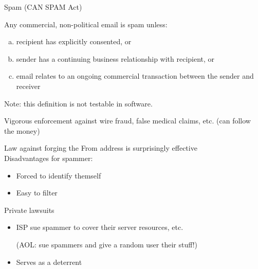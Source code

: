 \begin{definition}{Spam (CAN SPAM Act)}

Any commercial, non-political email is spam unless:
\begin{enumerate}[(a)]
    \item recipient has explicitly consented, or
    \item sender has a continuing business relationship with recipient, or
    \item email relates to an ongoing commercial transaction between the sender
        and receiver
\end{enumerate}
\end{definition}
Note: this definition is not testable in software.

Vigorous enforcement against wire fraud, false medical claims, etc. (can follow
the money)

Law against forging the From address is surprisingly effective\\
Disadvantages for spammer:
\begin{itemize}
    \item Forced to identify themself
    \item Easy to filter
\end{itemize}

Private lawsuits
\begin{itemize}
    \item ISP sue spammer to cover their server resources, etc.

    (AOL: sue spammers and give a random user their stuff!)
    \item Serves as a deterrent
\end{itemize}

